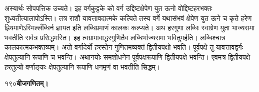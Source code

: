 \documentclass[11pt, openany]{book}
\begin{document}
\begin{sloppypar}
\hangindent=0.2in \hspace{0.2in}अस्यार्थः सोपपत्तिक उच्यते। इह वर्गकुट्टके को वर्ग उद्दिष्टक्षेपेण युत ऊनो वोद्दिष्टहरभक्तः शुध्यतीत्यालापोऽस्ति। तत्र राशौ यावत्तावदात्मके कल्पिते तस्य वर्गे यथासंभवं क्षेपेण युत ऊने च कृते हरेण ह्रियमाणेऽस्मिल्लँब्धिर्न ज्ञायत इति लब्धिप्रमाणं कालकः कल्प्यते। अथ हरगुणा लब्धिः स्वाग्रेण युता भाज्यसमा भवतीति सर्वत्र प्रसिद्धमस्ति। इह त्वग्रामावाद्धरगुणितैव लब्धिर्भाज्यसमा भवितुमर्हति। लब्धिश्चात्र कालकात्मकभक्तव्यम्। अतो वर्गादेर्यो हरस्तेन गुणितमव्यक्तं द्वितीयपक्षो भवति। पूर्वपक्षे तु यावत्तावद्वर्गः क्षेपतुल्यानि रूपाणि च भवन्ति। अथानयोः समशोधनेन पूर्वपक्षरूपाणि द्वितीयपक्षे भवन्ति। एवमत्र द्वितीयपक्षे हरतुल्यो वर्णाङ्कः क्षेपतुल्यानि रूपाणि धनमृणं वा भवतीति सिद्धम्।
\end{sloppypar}
\thispagestyle{empty}
\newpage

\onehalfspacing
 १९०\hspace{2in}\textbf{बीजगणितम्।} 

\vspace{5mm}
\end{document}
